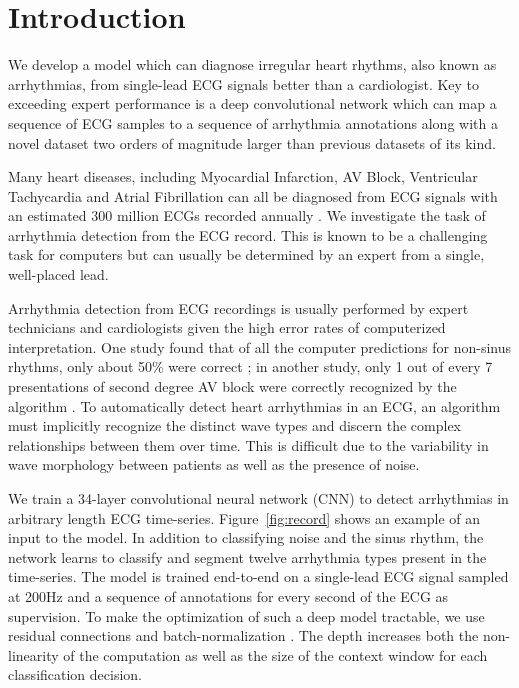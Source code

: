 \section{Introduction}
\label{sec:arrhythmias:intro}

We develop a model which can diagnose irregular heart rhythms, also known as
arrhythmias, from single-lead ECG signals better than a cardiologist. Key to
exceeding expert performance is a deep convolutional network which can map a
sequence of ECG samples to a sequence of arrhythmia annotations along with a
novel dataset two orders of magnitude larger than previous datasets of its
kind.

Many heart diseases, including Myocardial Infarction, AV Block, Ventricular
Tachycardia and Atrial Fibrillation can all be diagnosed from ECG signals with
an estimated 300 million ECGs recorded annually \cite{heden1996detection}. We
investigate the task of arrhythmia detection from the ECG record. This is known
to be a challenging task for computers but can usually be determined by an
expert from a single, well-placed lead.

Arrhythmia detection from ECG recordings is usually performed by expert
technicians and cardiologists given the high error rates of computerized
interpretation.  One study found that of all the computer predictions for
non-sinus rhythms, only about 50\% were correct \cite{shah2007errors}; in
another study, only 1 out of every 7 presentations of second degree AV block
were correctly recognized by the algorithm \cite{guglin2006common}. To
automatically detect heart arrhythmias in an ECG, an algorithm must implicitly
recognize the distinct wave types and discern the complex relationships between
them over time. This is difficult due to the variability in wave morphology
between patients as well as the presence of noise.

We train a 34-layer convolutional neural network (CNN) to detect arrhythmias in
arbitrary length ECG time-series. Figure~\ref{fig:record} shows an example of
an input to the model. In addition to classifying noise and the sinus rhythm,
the network learns to classify and segment twelve arrhythmia types present in
the time-series. The model is trained end-to-end on a single-lead ECG signal
sampled at 200Hz and a sequence of annotations for every second of the ECG as
supervision. To make the optimization of such a deep model tractable, we use
residual connections and batch-normalization \cite{he2016deep, ioffe2015batch}.
The depth increases both the non-linearity of the computation as well as the
size of the context window for each classification decision.

